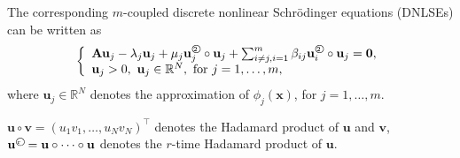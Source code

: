 \documentclass[12pt]{article}
\def\bA{{\mathbf A}}
\def\bu{{\mathbf u}}
\def\bv{{\mathbf v}}
\def\bx{{\mathbf x}}
\def\bzero{{\mathbf 0}}
\def\bcirc{\text{$\bigcirc$ \hspace{-0.42cm} {\tiny\rm 2}~}}
\def\rcirc{\text{$\bigcirc$ \hspace{-0.42cm} {\tiny\rm r}~}}
\begin{document}
The corresponding $m$-coupled discrete nonlinear Schr\"odinger
equations (DNLSEs) can be written as
\begin{equation}
\left\{\begin{array}{l}
\bA\bu_j-\lambda_j\bu_j+\mu_j\bu_j^\bcirc\circ\bu_j+
\sum_{i\neq j,i=1}^m\beta_{ij}\bu_i^\bcirc\circ\bu_j=\bzero,\\
\bu_j>0,\ \bu_j\in \mathbb{R}^N,
\ \text{for }j=1,\ldots,m,\end{array}\right.
\end{equation}
where $\bu_j \in \mathbb{R}^{N}$ denotes the approximation of
$\phi_j(\bx)$, for $j=1,\ldots,m$.


$\bu\circ\bv=(u_1v_1,\ldots,u_Nv_N)^{\top}$ denotes the Hadamard product of $\bu$ and $\bv$, $\bu^{\rcirc}=\bu\circ\cdots\circ\bu$
denotes the $r$-time Hadamard product of $\bu$.
\end{document}
